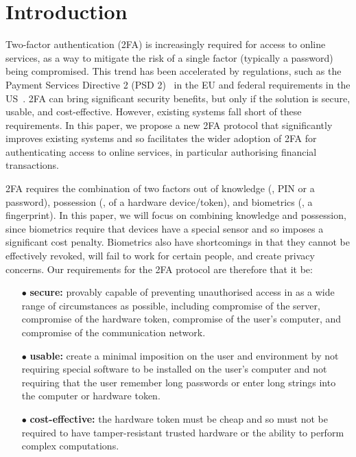 


\section{Introduction}

Two-factor authentication (2FA) is increasingly required for access to online services, as a way to mitigate the risk of a single factor (typically a password) being compromised.
This trend has been accelerated by regulations, such as the Payment Services Directive 2 (PSD 2)~\cite{psd2} in the EU and federal requirements in the US~\cite{Zero-Trust-Cybersecurity}.
2FA can bring significant security benefits, but only if the solution is secure, usable, and cost-effective.
However, existing systems fall short of these requirements.
In this paper, we propose a new 2FA protocol that significantly improves existing systems and so facilitates the wider adoption of 2FA for authenticating access to online services, in particular authorising financial transactions.

2FA requires the combination of two factors out of knowledge (\eg, PIN or a password), possession (\eg, of a hardware device/token), and biometrics (\eg, a fingerprint).
In this paper, we will focus on combining knowledge and possession, since biometrics require that devices have a special sensor and so imposes a significant cost penalty.
Biometrics also have shortcomings in that they cannot be effectively revoked, will fail to work for certain people, and create privacy concerns. Our requirements for the 2FA protocol are therefore that it be:%

\begin{itemize}
\item[$\bullet$]\textbf{secure:} provably capable of preventing unauthorised access in as a wide range of circumstances as possible, including compromise of the server, compromise of the hardware token, compromise of the user's computer, and compromise of the communication network.

\item[$\bullet$]\textbf{usable:} create a minimal imposition on the user and environment by not requiring special software to be installed on the user's computer and not requiring that the user remember long passwords or enter long strings into the computer or hardware token.

\item[$\bullet$]\textbf{cost-effective:} the hardware token must be cheap and so must not be required to have tamper-resistant trusted hardware or the ability to perform complex computations.
\end{itemize}

